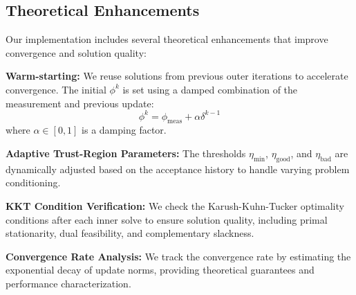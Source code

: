 \subsection{Theoretical Enhancements}

Our implementation includes several theoretical enhancements that improve convergence and solution quality:

\textbf{Warm-starting:} We reuse solutions from previous outer iterations to accelerate convergence. The initial $\phi^k$ is set using a damped combination of the measurement and previous update:
\begin{equation}
\phi^k = \phi_{\text{meas}} + \alpha \delta^{k-1}
\end{equation}
where $\alpha \in [0,1]$ is a damping factor.

\textbf{Adaptive Trust-Region Parameters:} The thresholds $\eta_{\text{min}}$, $\eta_{\text{good}}$, and $\eta_{\text{bad}}$ are dynamically adjusted based on the acceptance history to handle varying problem conditioning.

\textbf{KKT Condition Verification:} We check the Karush-Kuhn-Tucker optimality conditions after each inner solve to ensure solution quality, including primal stationarity, dual feasibility, and complementary slackness.

\textbf{Convergence Rate Analysis:} We track the convergence rate by estimating the exponential decay of update norms, providing theoretical guarantees and performance characterization.
